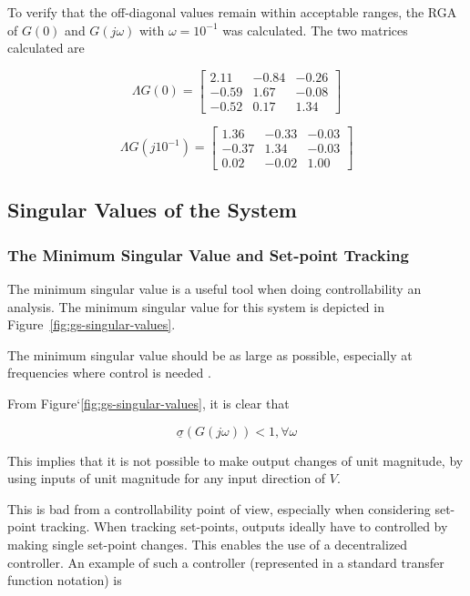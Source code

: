 To verify that the off-diagonal values remain within acceptable ranges, the RGA of $G(0)$ and $G(j\omega)$ with $\omega = 10^{-1}$ was calculated. The two matrices calculated are

\begin{equation}
	\Lambda G(0) = \begin{bmatrix}
	2.11 & -0.84 & -0.26\\
	-0.59 & 1.67 & -0.08\\
	-0.52 & 0.17 & 1.34
	\end{bmatrix}
\end{equation}

\begin{equation}
\Lambda G(j10^{-1}) = \begin{bmatrix}
1.36 & -0.33 & -0.03\\
-0.37 & 1.34 & -0.03\\
0.02 & -0.02 & 1.00
\end{bmatrix}
\end{equation}

\subsection{Singular Values of the System}

\subsubsection{The Minimum Singular Value and Set-point Tracking}

The minimum singular value is a useful tool when doing controllability an analysis. The minimum singular value for this system is depicted in Figure~\ref{fig:gs-singular-values}.

The minimum singular value should be as large as possible, especially at frequencies where control is needed \parencite{skogestad}.

From Figure`\ref{fig:gs-singular-values}, it is clear that

\begin{equation}
	\label{eq: Min singular alue criteria}
	\underline{\sigma}(G(j\omega)) < 1 , \forall \omega
\end{equation}

This implies that it is not possible to make output changes of unit magnitude, by using inputs of unit magnitude for any input direction of $V$. 

This is bad from a controllability point of view, especially when considering set-point tracking. When tracking set-points, outputs ideally have to controlled by making single set-point changes. This enables the use of a decentralized controller. An example of such a controller (represented in a standard transfer function notation) is

